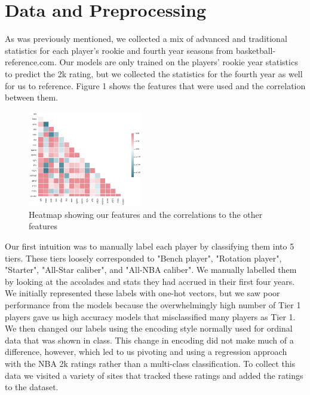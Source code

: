 \documentclass{article}
\begin{document}
\section{Data and Preprocessing}
As was previously mentioned, we collected a mix of advanced and traditional statistics for each player's rookie and fourth year seasons from basketball-reference.com. Our models are only trained on the players' rookie year statistics to predict the 2k rating, but we collected the statistics for the fourth year as well for us to reference. Figure 1 shows the features that were used and the correlation between them. 
\begin{figure}[htp]
    \centering
    \includegraphics[width=5cm]{feature_heatmap.png}
    \caption{Heatmap showing our features and the correlations to the other features}
\end{figure} 

Our first intuition was to manually label each player by classifying them into 5 tiers. These tiers loosely corresponded to "Bench player", "Rotation player", "Starter", "All-Star caliber", and "All-NBA caliber". We manually labelled them by looking at the accolades and stats they had accrued in their first four years. We initially represented these labels with one-hot vectors, but we saw poor performance from the models because the overwhelmingly high number of Tier 1 players gave us high accuracy models that misclassified many players as Tier 1. We then changed our labels using the encoding style normally used for ordinal data that was shown in class. This change in encoding did not make much of a difference, however, which led to us pivoting and using a regression approach with the NBA 2k ratings rather than a multi-class classification. To collect this data we visited a variety of sites that tracked these ratings and added the ratings to the dataset.
\end{document}
